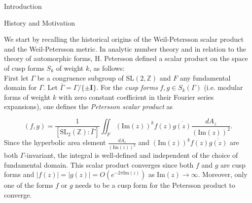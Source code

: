 \documentclass[12pt]{amsart}
\theoremstyle{plain}
\theoremstyle{definition}
\theoremstyle{remark}
\numberwithin{equation}{section} %
\numberwithin{figure}{section} %
\begin{document}
\maketitle
\begin{section}{Introduction}
\begin{subsection}{History and Motivation}


{We start by recalling the historical origins of the Weil-Petersson scalar product and the Weil-Petersson metric. In analytic number theory and in relation to the theory of automorphic forms, H. Petersson \cite{Petersson} defined a scalar product on the space of cusp forms $S_k$ of weight $k$, as follows:\\
  First let \(\Gamma\) be a congruence subgroup of \(\mathrm{SL}(2,\mathbb{Z})\) and \({F}\) any fundamental domain
for \(\Gamma .\) Let \(\bar{\Gamma}=\Gamma /\{\pm \mathbf{I}\} .\) For the {\it{cusp forms}} \(f, g \in S_{k}(\Gamma)\) (i.e. modular forms of weight $k$ with zero constant coefficient in their Fourier series expansions), one defines the {\it {Petersson scalar product}} as 

\begin{equation}\label{Petersson scalar}
(f, g)=\frac{1}{\left[\mathrm{SL}_{2}(\mathbb{Z}): \bar{\Gamma}\right]} \iint_{{F}} (\mathrm{Im}(z))^{k} f(z) \overline{g(z)} \frac{d A_z}{(\mathrm{Im}(z))^{2}}.
\end{equation}
 Since the hyperbolic area element \(\frac{d A_z}{(\mathrm{Im}(z))^{2}}\) and \((\mathrm{Im}(z))^{k} f(z) \overline{g(z)}\) are both \(\Gamma\)-invariant, the integral is well-defined and independent of the choice
of fundamental domain. This scalar product  converges since both \(f\)
and \(g\) are cusp forms and \(|f(z)|=|g(z)|=O\left(e^{-2 \pi \mathrm{Im}(z)}\right)\) as \(\mathrm{Im}(z)\rightarrow \infty\). Moreover, only one of the forms $f$ or $g$ needs to be a cusp form for the Petersson product to converge.\\

}
\end{subsection}
\end{section}
\end{document}
